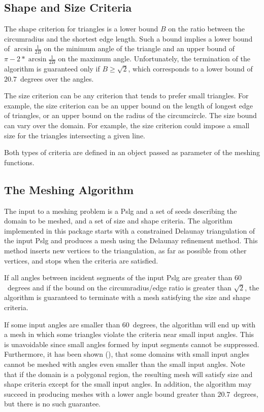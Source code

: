 \subsection{Shape and Size Criteria}
\label{sec:Mesh_2_criteria}

The shape criterion for triangles is a lower bound $B$ on the ratio
between the circumradius and the shortest edge length.  Such a bound
implies a lower bound of $\arcsin{\frac{1}{2B}}$ on the minimum angle
of the triangle and an upper bound of $\pi - 2* \arcsin{\frac{1}{2B}}$
on the maximum angle.  Unfortunately, the termination of the algorithm
is guaranteed only if $B \ge \sqrt{2}$, which corresponds to a lower
bound of $20.7$~degrees over the angles.

The size criterion can be any criterion that tends to prefer small
triangles. For example, the size criterion can be an upper bound on the
length of longest edge of triangles, or an upper bound on the radius of the
circumcircle. The size bound can vary over the domain. For example,
the size criterion could impose a small size for the triangles intersecting
a given line.

Both types of criteria are defined in an object  passed as
parameter of the meshing functions.

\subsection{The Meshing Algorithm}

The input to a meshing problem is a {\sc Pslg} and a set of seeds
describing the domain to be meshed, and a set of size and shape
criteria.  The algorithm implemented in this package starts with a
constrained Delaunay triangulation of the input {\sc Pslg} and produces a
mesh using the Delaunay refinement method. This method inserts new vertices to
the triangulation, as far as possible from other vertices, and stops when the
criteria are satisfied.

If all angles between incident segments of the input {\sc Pslg}
are greater than $60$~degrees and if the bound on the
circumradius/edge ratio is greater than $\sqrt{2}$,
the algorithm is guaranteed to terminate with a mesh
satisfying the size and shape criteria.

If some input angles are smaller than $60$~degrees, the algorithm will
end up with a mesh in which some triangles violate the criteria near small
input angles. This is unavoidable since small angles formed
by input segments cannot be suppressed. Furthermore, it has been
shown (\cite{s-mgdsa-00}), that some domains with small input angles
cannot be meshed with angles even smaller than the small input angles.
Note that if the domain is a polygonal region, the resulting mesh will
satisfy size and shape criteria except for the small input angles.
In addition, the algorithm may succeed in producing meshes with a lower
angle bound greater than $20.7$~degrees, but there is no such guarantee.


